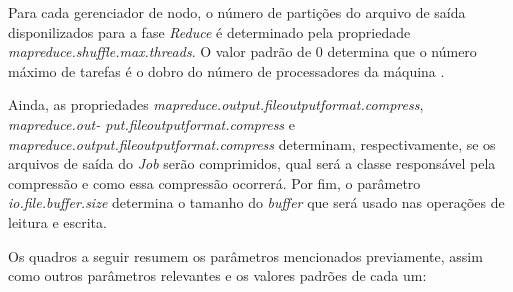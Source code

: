 Para cada gerenciador de nodo, o número de partições do arquivo de saída disponilizados para a fase \textit{Reduce} é determinado pela propriedade \textit{mapreduce.shuffle.max.threads}. O valor padrão de 0 determina que o número máximo de tarefas é o dobro do número de processadores da máquina \cite{ProHadoop09}.

Ainda, as propriedades \textit{mapreduce.output.fileoutputformat.compress}, \textit{mapreduce.out- put.fileoutputformat.compress} e \textit{mapreduce.output.fileoutputformat.compress} determinam, respectivamente, se os arquivos de saída do \textit{Job} serão comprimidos, qual será a classe responsável pela compressão e como essa compressão ocorrerá. Por fim, o parâmetro \textit{io.file.buffer.size} determina o tamanho do \textit{\gls{buffer}} que será usado nas operações de leitura e escrita.

Os quadros a seguir resumem os parâmetros mencionados previamente, assim como outros parâmetros relevantes e os valores padrões de cada um:

